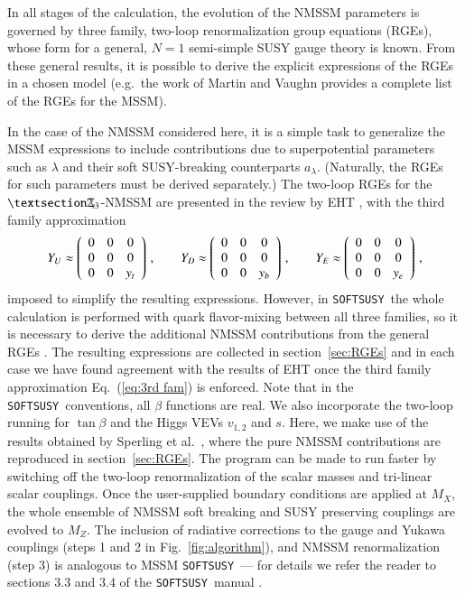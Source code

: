 \documentclass[final,3p,times,pdflatex]{elsarticle}
\def\SOFTSUSY{{\tt SOFTSUSY}}
\newcommand{\Zv}{\,\mathbf{\backslash}\mkern-11.0mu{\mathbb{Z}}_{3}} %
\begin{document}
In all stages of the calculation, the evolution of the NMSSM parameters is 
governed by three family, two-loop renormalization group equations (RGEs), whose
 form \cite{MV94,Yam94} for a general, $N=1$ semi-simple SUSY gauge 
theory is known. From these general results, it is possible to derive the 
explicit expressions of the RGEs in a chosen model (e.g.\ the work of Martin and
 Vaughn \cite{MV94} provides a complete list of the RGEs for the MSSM).  

In the case of the NMSSM considered here, it is a simple task to generalize the 
MSSM expressions \cite{MV94} to include contributions due to superpotential 
parameters such as $\lambda$ and their soft SUSY-breaking counterparts 
$a_\lambda$.  (Naturally, the RGEs for such parameters must be derived 
separately.)  The two-loop RGEs for the $§\Zv$-NMSSM are presented in the review by EHT \cite{Ellwanger:2009dp}, with  
the third family approximation
%
\begin{equation}
Y_U \approx \left(\begin{array}{c c c} 
0 & 0 & 0 \\
0 & 0 & 0 \\
0 & 0 & y_t 
\end{array}\right) \,, \qquad
%
Y_D \approx \left(\begin{array}{c c c} 
0 & 0 & 0 \\
0 & 0 & 0 \\
0 & 0 & y_b 
\end{array}\right) \,, \qquad
%
Y_E \approx \left(\begin{array}{c c c} 
0 & 0 & 0 \\
0 & 0 & 0 \\
0 & 0 & y_e 
\end{array}\right)\,,
\label{eq:3rd fam} 
\end{equation}
%
imposed to simplify the resulting expressions.
However, in \SOFTSUSY~the whole calculation is performed with quark 
flavor-mixing between all three families, so it is necessary to derive the 
additional NMSSM contributions from the general RGEs \cite{MV94,Yam94}.  The 
resulting expressions are collected in section~\ref{sec:RGEs} and in each case we have 
found agreement with the results of EHT \cite{Ellwanger:2009dp} once the third 
family approximation Eq.~(\ref{eq:3rd fam}) is enforced.  Note that in the 
\SOFTSUSY~conventions, all $\beta$ functions are real.
We also incorporate the two-loop running for $\tan\beta$ and the Higgs VEVs  
$v_{1,2}$ and $s$.  Here, we make use of the results obtained by 
Sperling et al.\ \cite{Sper13,Sper13-2}, where the pure   NMSSM contributions 
are reproduced in section~\ref{sec:RGEs}.
The program can be made to run faster by switching off the two-loop
 renormalization of the scalar masses and tri-linear scalar couplings.
Once the user-supplied boundary conditions are applied at $M_X$, the whole 
ensemble of NMSSM soft breaking and SUSY preserving couplings are evolved to 
$M_Z$. The inclusion of radiative corrections to the gauge and Yukawa couplings 
(steps 1 and 2 in Fig.~\ref{fig:algorithm}), and NMSSM renormalization (step 3)
 is analogous to MSSM \SOFTSUSY~--- for details we refer the reader to sections
3.3 and 3.4 of the \SOFTSUSY~manual \cite{Allanach:2001kg}.
\end{document}

